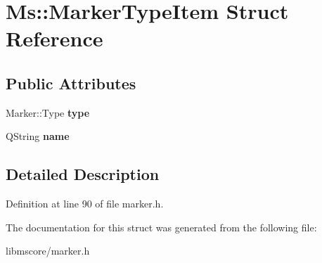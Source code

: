 \hypertarget{struct_ms_1_1_marker_type_item}{}\section{Ms\+:\+:Marker\+Type\+Item Struct Reference}
\label{struct_ms_1_1_marker_type_item}
\subsection*{Public Attributes}
\begin{DoxyCompactItemize}
\item 
\mbox{\label{struct_ms_1_1_marker_type_item_ad3be82e64b0b0e108b6f3466c02a6345}} 
Marker\+::\+Type {\bfseries type}
\item 
\mbox{\label{struct_ms_1_1_marker_type_item_ab4457db6e5e549e79c34ee0569b23052}} 
Q\+String {\bfseries name}
\end{DoxyCompactItemize}


\subsection{Detailed Description}


Definition at line 90 of file marker.\+h.



The documentation for this struct was generated from the following file\+:\begin{DoxyCompactItemize}
\item 
libmscore/marker.\+h\end{DoxyCompactItemize}
